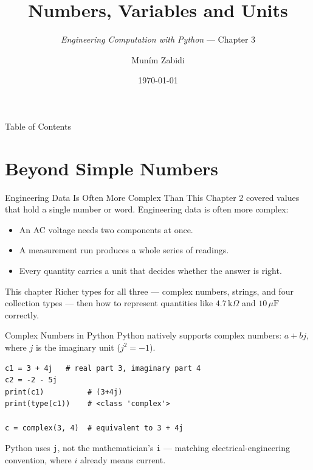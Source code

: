 \documentclass[9pt,aspectratio=169,xcolor=table]{beamer}
\title{Numbers, Variables and Units}
\subtitle{\emph{Engineering Computation with Python} --- Chapter 3}
\author{Mun\'{i}m Zabidi}
\institute{\color{primary}Faculty of Electrical Engineering, Universiti Teknologi Malaysia}
\date{\today}
\begin{document}
\titlepage

\begin{frame}{Table of Contents}
    \tableofcontents
\end{frame}

\section{Beyond Simple Numbers}

\begin{frame}{Engineering Data Is Often More Complex Than This}
    \leavevmode
    Chapter 2 covered values that hold a single number or word.
    Engineering data is often more complex:

    \vspace{2mm}
    \begin{itemize}
        \item An AC voltage needs \alert{two components} at once.
        \item A measurement run produces a \alert{whole series} of
              readings.
        \item Every quantity carries a \alert{unit} that decides whether
              the answer is right.
    \end{itemize}

    \vspace{3mm}
    \begin{block}{This chapter}
        Richer types for all three --- complex numbers, strings, and
        four collection types --- then how to represent quantities like
        $4.7\,\text{k}\Omega$ and $10\,\mu\text{F}$ correctly.
    \end{block}
\end{frame}

\begin{frame}[fragile]{Complex Numbers in Python}
    \leavevmode
    Python natively supports complex numbers: $a + bj$, where $j$ is the
    imaginary unit ($j^2=-1$).

\begin{lstlisting}
c1 = 3 + 4j   # real part 3, imaginary part 4
c2 = -2 - 5j
print(c1)          # (3+4j)
print(type(c1))    # <class 'complex'>

c = complex(3, 4)  # equivalent to 3 + 4j
\end{lstlisting}

    \vspace{1mm}
    {\small Python uses \texttt{j}, not the mathematician's \texttt{i}
    --- matching electrical-engineering convention, where $i$ already
    means current.}
\end{frame}
\end{document}
